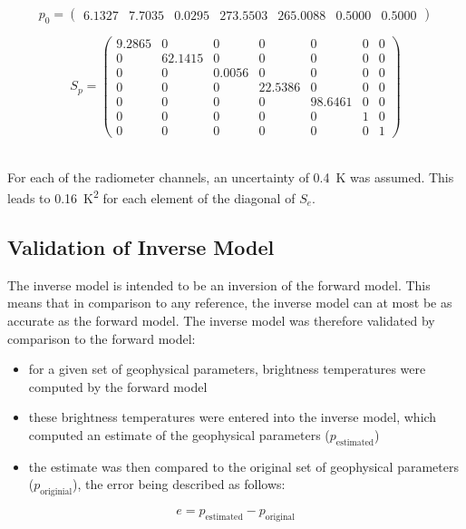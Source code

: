 \documentclass[11pt, a4paper]{article}
\begin{document}
\begin{equation*}
p_0 =
\begin{pmatrix}
   6.1327 & 7.7035 & 0.0295 & 273.5503 & 265.0088 & 0.5000 & 0.5000
\end{pmatrix}
\end{equation*}

\begin{equation*}
S_p =
\begin{pmatrix}
   9.2865 & 0 & 0 & 0 & 0 & 0 & 0 \\
   0 & 62.1415 & 0 & 0 & 0 & 0 & 0 \\
   0 & 0 & 0.0056 & 0 & 0 & 0 & 0 \\
   0 & 0 & 0 & 22.5386 & 0 & 0 & 0 \\
   0 & 0 & 0 & 0 & 98.6461 & 0 & 0 \\
   0 & 0 & 0 & 0 & 0 & 1 & 0 \\
   0 & 0 & 0 & 0 & 0 & 0 & 1
\end{pmatrix}
\end{equation*}

\ \\
For each of the radiometer channels, an uncertainty of \SI{0.4}{K} was assumed. This leads to \SI{0.16}{K^2} for each element of the diagonal of \(S_e\).






\subsection{Validation of Inverse Model}

The inverse model is intended to be an inversion of the forward model. This means that in comparison to any reference, the inverse model can at most be as accurate as the forward model. The inverse model was therefore validated by comparison to the forward model: 
\begin{itemize}
\item for a given set of geophysical parameters, brightness temperatures were computed by the forward model
\item these brightness temperatures were entered into the inverse model, which computed an estimate of the geophysical parameters (\(p_\text{estimated}\))
\item the estimate was then compared to the original set of geophysical parameters (\(p_\text{originial}\)), the error being described as follows:
\end{itemize}
\begin{equation*}
e = p_\text{estimated} - p_\text{original}
\end{equation*}
\end{document}
